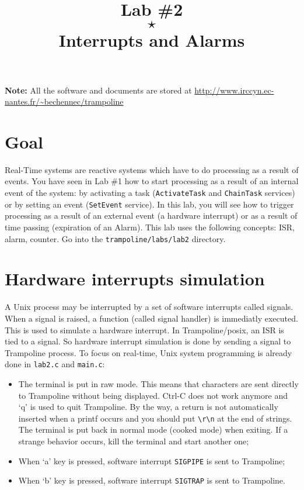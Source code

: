 \documentclass[11pt]{article}
\title{Lab \#2\\$\star$\\Interrupts and Alarms}
\author{}
\begin{document}
\maketitle

{\bf Note:} All the software and documents are stored at \url{http://www.irccyn.ec-nantes.fr/~bechennec/trampoline}

\section{Goal}

Real-Time systems are reactive systems which have to do processing as a result of events. You have seen in Lab \#1 how to start processing as a result of an internal event of the system: by activating a task (\texttt{ActivateTask} and \texttt{ChainTask} services) or by setting an event (\texttt{SetEvent} service). In this lab, you will see how to trigger processing as a result of an external event (a hardware interrupt) or as a result of time passing (expiration of an Alarm). This lab uses the following concepts: ISR, alarm, counter.
Go into the \texttt{trampoline/labs/lab2} directory.

\section{Hardware interrupts simulation}

A Unix process may be interrupted by a set of software interrupts called signals. When a signal is raised, a function (called signal handler) is immediatly executed. This is used to simulate a hardware interrupt. In Trampoline/posix, an ISR is tied to a signal.
So hardware interrupt simulation is done by sending a signal to Trampoline process. To focus on real-time, Unix system programming is already done in \texttt{lab2.c} and \texttt{main.c}:

\begin{itemize}
\item The terminal is put in raw mode. This means that characters are sent directly to Trampoline without being displayed. Ctrl-C does not work anymore and `q' is used to quit Trampoline. By the way, a return is not automatically inserted when a printf occurs and you should put \texttt{\textbackslash r\textbackslash n} at the end of strings. The terminal is put back in normal mode (cooked mode) when exiting. If a strange behavior occurs, kill the terminal and start another one;
\item When `a' key is pressed, software interrupt \texttt{SIGPIPE} is sent to Trampoline;
\item When `b' key is pressed, software interrupt \texttt{SIGTRAP} is sent to Trampoline.
\end{itemize}
\end{document}
